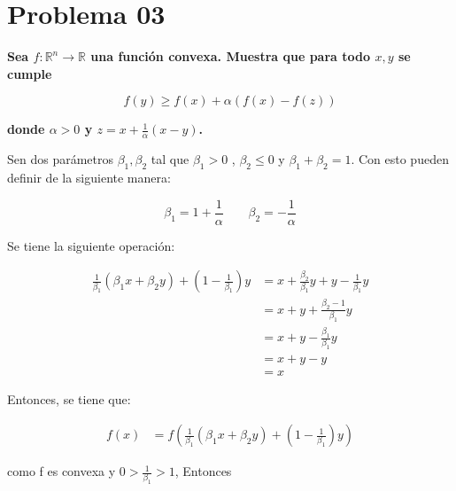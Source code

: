 
\section*{Problema 03}

\textbf{Sea $f:\mathbb{R}^n \rightarrow \mathbb{R}$ una función convexa. Muestra que para todo $x,y$ se cumple}

\begin{equation*}
    f(y) \geq f(x)+\alpha (f(x)-f(z))
\end{equation*}

\textbf{donde $\alpha>0$ y $z=x+\frac{1}{\alpha}(x-y)$.}

Sen dos parámetros $\beta_1,\beta_2$ tal que $\beta_1 >0$ , $\beta_2\leq 0$ y $\beta_1+\beta_2=1$. Con esto pueden definir de la siguiente manera:

\begin{equation*}
    \beta_1 = 1+\frac{1}{\alpha} \qquad \beta_2 = -\frac{1}{\alpha}
\end{equation*}

Se tiene la siguiente operación:

\begin{align*}
    \frac{1}{\beta_1} (\beta_1 x+\beta_2 y) + \left (1-\frac{1}{\beta_1}\right ) y & = x+ \frac{\beta_2}{\beta_1} y + y - \frac{1}{\beta_1} y \\
                                                                                   & = x+y+\frac{\beta_2-1}{\beta_1} y                        \\
                                                                                   & = x+y-\frac{\beta_1}{\beta_1} y                          \\
                                                                                   & = x+y-y                                                  \\
                                                                                   & = x
\end{align*}

Entonces, se tiene que:

\begin{align*}
    f(x) & = f\left (\frac{1}{\beta_1} (\beta_1 x+\beta_2 y) + \left (1-\frac{1}{\beta_1}\right ) y\right )
\end{align*}

como f es convexa y $0>\frac{1}{\beta_1}>1$, Entonces

